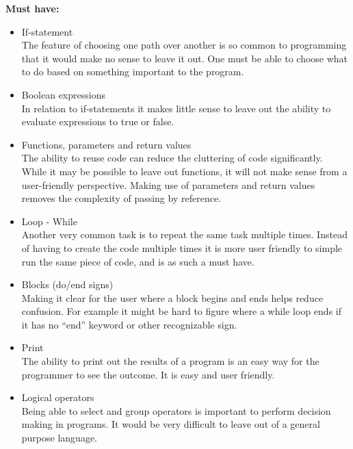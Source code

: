 \textbf{Must have:}
\begin{itemize}
\item If-statement \\
The feature of choosing one path over another is so common to programming that it would make no sense to leave it out. One must be able to choose what to do based on something important to the program. \\

\item Boolean expressions \\
In relation to if-statements it makes little sense to leave out the ability to evaluate expressions to true or false. \\

\item Functions, parameters and return values \\
The ability to reuse code can reduce the cluttering of code significantly. While it may be possible to leave out functions, it will not make sense from a user-friendly perspective. Making use of parameters and return values removes the complexity of passing by reference. \\

\item Loop - While \\
Another very common task is to repeat the same task multiple times. Instead of having to create the code multiple times it is more user friendly to simple run the same piece of code, and is as such a must have. \\

\item Blocks (do/end signs) \\
Making it clear for the user where a block begins and ends helps reduce confusion. For example it might be hard to figure where a while loop ends if it has no ``end'' keyword or other recognizable sign. \\

\item Print \\
The ability to print out the results of a program is an easy way for the programmer to see the outcome. It is easy and user friendly. \\

\item Logical operators \\
Being able to select and group operators is important to perform decision making in programs. It would be very difficult to leave out of a general purpose language.\\


\end{itemize}
